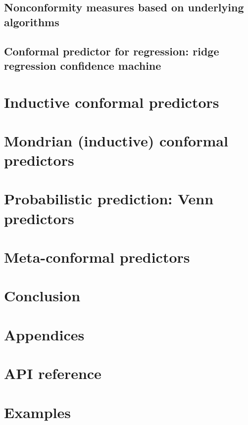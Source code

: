 \documentclass[twoside,11pt]{article}
\begin{document}

\subsection{Nonconformity measures based on underlying
            algorithms}



\subsection{Conformal predictor for regression: ridge
            regression confidence machine}
\label{subsec:rrcm}

\section{Inductive conformal predictors}

\section{Mondrian (inductive) conformal predictors}

\section{Probabilistic prediction: Venn predictors}

\section{Meta-conformal predictors}

\section{Conclusion}

\renewcommand{\appendixpagename}{}
\begin{appendices}
  \section*{Appendices}

  \section{API reference}
  \label{appendix:a}

  \section{Examples}
  \label{appendix:b}

\end{appendices}


\end{document}
